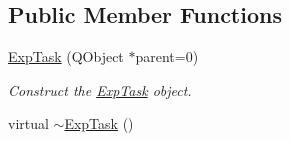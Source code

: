 \subsection*{Public Member Functions}
\begin{DoxyCompactItemize}
\item 
\hyperlink{class_exp_task_ab741ec0a236695211f2b772881ae756c}{Exp\+Task} (Q\+Object $\ast$parent=0)
\begin{DoxyCompactList}\small\item\em Construct the \hyperlink{class_exp_task}{Exp\+Task} object. \end{DoxyCompactList}\item 
\hypertarget{class_exp_task_a069cc9e82376256ef25b76d19f881901}{}virtual \hyperlink{class_exp_task_a069cc9e82376256ef25b76d19f881901}{$\sim$\+Exp\+Task} ()\label{class_exp_task_a069cc9e82376256ef25b76d19f881901}


\end{DoxyCompactItemize}
